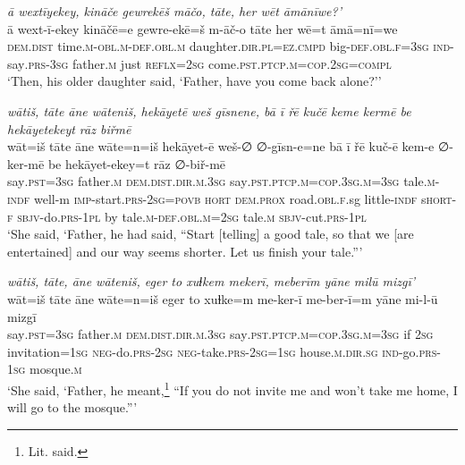 \ea \label{ŽH.22}
\textit{ā wextīyekey, kināče gewrekēš māčo, tāte, her wēt āmānīwe?’} \\ 
\gll ā wext-ī-ekey kināčē=e gewre-ekē=š m-āč-o tāte her wē=t āmā=nī=we \\ 
 \textsc{dem.dist} time\textsc{.m}\textsc{-obl}\textsc{.m}\textsc{-def}\textsc{.obl}\textsc{.m} daughter\textsc{.dir}\textsc{.pl}\textsc{=ez}\textsc{.cmpd} big\textsc{-def}\textsc{.obl}\textsc{\textsc{.f}}\textsc{=3sg} \textsc{ind-}say\textsc{.prs}\textsc{-3sg} father\textsc{.m} just \textsc{reflx}\textsc{=\textsc{2sg}} come\textsc{.pst}\textsc{.ptcp}\textsc{.m}\textsc{=cop}\textsc{.\textsc{2sg}}\textsc{=compl} \\ 
\glt `Then, his older daughter said, ‘Father, have you come back alone?’'
\z 
 
\ea \label{ŽH.27}
\textit{wātiš, tāte āne wāteniš, hekāyetē weš gīsnene, bā ī řē kučē keme kermē be hekāyetekeyt rāz biřmē} \\ 
\gll wāt=iš tāte āne wāte=n=iš hekāyet-ē weš-∅ ∅-gīsn-e=ne bā ī řē kuč-ē kem-e ∅-ker-mē be hekāyet-ekey=t rāz ∅-biř-mē \\ 
 say\textsc{.pst}\textsc{=3sg} father\textsc{.m} \textsc{dem.dist}\textsc{.dir}\textsc{.m}\textsc{.3sg} say\textsc{.pst}\textsc{.ptcp}\textsc{.m}\textsc{=cop}\textsc{.3sg}\textsc{.m}\textsc{=3sg} tale\textsc{.m}\textsc{-indf} well-m \textsc{imp-}start\textsc{.prs}-\textsc{2sg}\textsc{=\textsc{povb}} \textsc{hort} \textsc{dem.prox} road\textsc{.obl}\textsc{\textsc{.f}}.sg little\textsc{-indf} s\textsc{hort}\textsc{-f} \textsc{sbjv-}do\textsc{.prs}\textsc{-1pl} by tale\textsc{.m}\textsc{-def}\textsc{.obl}\textsc{.m}\textsc{=\textsc{2sg}} tale\textsc{.m} \textsc{sbjv-}cut\textsc{.prs}\textsc{-1pl} \\ 
\glt `She said, ‘Father, he had said, “Start [telling] a good tale, so that we [are entertained] and our way seems shorter. Let us finish your tale.”'
\z 
 
\ea \label{ŽH.33}
\textit{wātiš, tāte, āne wāteniš, eger to xuɫkem mekerī, meberīm yāne milū mizgī’} \\ 
\gll wāt=iš tāte āne wāte=n=iš eger to xuɫke=m me-ker-ī me-ber-ī=m yāne mi-l-ū mizgī \\ 
 say\textsc{.pst}\textsc{=3sg} father\textsc{.m} \textsc{dem.dist}\textsc{.dir}\textsc{.m}\textsc{.3sg} say\textsc{.pst}\textsc{.ptcp}\textsc{.m}\textsc{=cop}\textsc{.3sg}\textsc{.m}\textsc{=3sg} if \textsc{2sg} invitation\textsc{=1sg} \textsc{neg-}do\textsc{.prs}-\textsc{2sg} \textsc{neg-}take\textsc{.prs}-\textsc{2sg}\textsc{=1sg} house\textsc{.m}\textsc{.dir.sg} \textsc{ind-}go\textsc{.prs}\textsc{-1sg} mosque\textsc{.m} \\ 
\glt `She said, ‘Father, he meant,\footnote{Lit. said.} “If you do not invite me and won’t take me home, I will go to the mosque.”'
\z 
 
